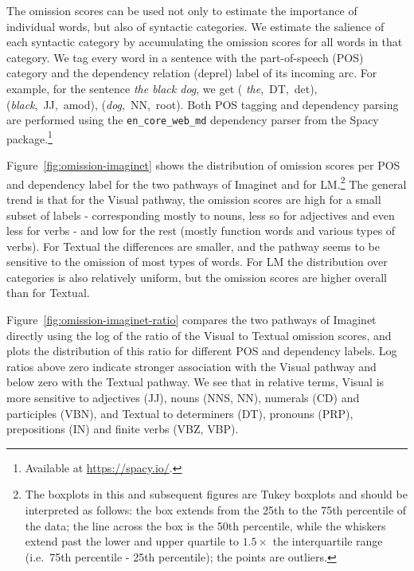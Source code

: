 The omission scores can be used not only to
estimate the importance of individual words, but also of syntactic
categories. We estimate the salience of each syntactic category by
accumulating the omission scores for all words in that category. We
tag every word in a sentence with the part-of-speech (POS) category
and the dependency relation (deprel) label of its incoming arc. For
example, for the sentence \emph{the black dog}, we get ({\it
  the},~DT,~det),
({\it black},~JJ,~amod), ({\it dog},~NN,~root).
Both POS tagging and dependency parsing are performed
using the  \verb+en_core_web_md+ dependency parser from the Spacy package.\footnote{Available at
  \url{https://spacy.io/}.}



Figure~\ref{fig:omission-imaginet} shows the distribution of omission
scores per POS and dependency label for the two pathways of {\sc
  Imaginet} and for {\sc LM}.\footnote{The boxplots in this and
  subsequent figures are Tukey boxplots and should be interpreted as follows: the box extends
from the 25th to the 75th percentile of the data; the line across the
box is the 50th percentile, while the whiskers extend past the lower
and upper quartile to $1.5\times$
the interquartile range (i.e.\ 75th percentile - 25th percentile); the
points are outliers.\label{ft:boxplots}}  The general trend is that for the {\sc
  Visual} pathway, the omission scores are high for a small subset of
labels - corresponding mostly to nouns, less so for adjectives and
even less for verbs - and low for the rest (mostly function words and
various types of verbs). For {\sc Textual} the differences
are \label{edit:textualomission} smaller, and the pathway seems to be
sensitive to the omission of most types of words.  For {\sc LM} the
distribution over categories is also relatively uniform, but the omission scores are higher
overall than for {\sc Textual}.

Figure~\ref{fig:omission-imaginet-ratio} compares the two pathways of
{\sc Imaginet} directly using the log of the ratio of the {\sc Visual}
to {\sc Textual} omission scores, and plots the distribution of this
ratio for different POS and dependency labels.  Log ratios above zero
indicate stronger association with the {\sc Visual} pathway and below
zero with the {\sc Textual} pathway. We see that in relative terms,
{\sc Visual} is more sensitive to adjectives (JJ), nouns (NNS, NN),
numerals (CD) and participles (VBN), and {\sc Textual} to determiners
(DT), pronouns (PRP), prepositions (IN) and finite verbs
(VBZ, VBP).

